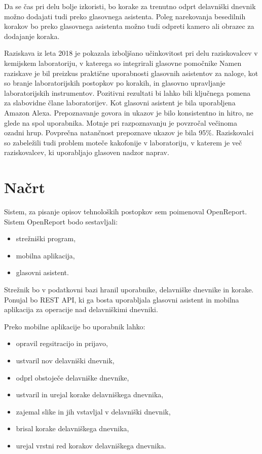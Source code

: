 \documentclass[a4paper, 12pt]{book}
\begin{document}
Da se čas pri delu bolje izkoristi, bo korake za trenutno odprt delavniški dnevnik možno dodajati tudi preko glasovnega asistenta.
Poleg narekovanja besedilnih korakov bo preko glasovnega asistenta možno tudi odpreti kamero ali obrazec za dodajanje koraka.

Raziskava iz leta 2018 je pokazala izboljšano učinkovitost pri delu raziskovalcev v kemijskem laboratoriju, v katerega so integrirali glasovne pomočnike %
Namen raziskave je bil preizkus praktične uporabnosti glasovnih asistentov za naloge, kot so branje laboratorijskih postopkov po korakih, in glasovno upravljanje laboratorijskih instrumentov.
Pozitivni rezultati bi lahko bili ključnega pomena za slabovidne člane laboratorijev.
Kot glasovni asistent je bila uporabljena Amazon Alexa.
Prepoznavanje govora in ukazov je bilo konsistentno in hitro, ne glede na spol uporabnika.
Motnje pri razpoznavanju je povzročal večinoma ozadni hrup.
Povprečna natančnost prepoznave ukazov je bila 95\%.
Raziskovalci so zabeležili tudi problem moteče kakofonije v laboratoriju, v katerem je več raziskovalcev, ki uporabljajo glasoven nadzor naprav.

\section{Načrt}

Sistem, za pisanje opisov tehnoloških postopkov sem poimenoval OpenReport. 
Sistem OpenReport bodo sestavljali:

\begin{itemize}
	\item strežniški program, 
	\item mobilna aplikacija,
	\item glasovni asistent.
\end{itemize}

Strežnik bo v podatkovni bazi hranil uporabnike, delavniške dnevnike in korake.
Ponujal bo REST API, ki ga bosta uporabljala glasovni asistent in mobilna aplikacija za operacije nad delavniškimi dnevniki.

Preko mobilne aplikacije bo uporabnik lahko:
\begin{itemize}
	\item opravil regsitracijo in prijavo,
	\item ustvaril nov delavniški dnevnik,
	\item odprl obstoječe delavniške dnevnike,
	\item ustvaril in urejal korake delavniškega dnevnika,
	\item zajemal slike in jih vstavljal v delavniški dnevnik,
	\item brisal korake delavniškega dnevnika,
	\item urejal vrstni red korakov delavniškega dnevnika.
\end{itemize}
\end{document}
